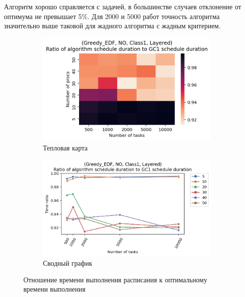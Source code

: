 Алгоритм хорошо справляется с задачей, в большинстве случаев отклонение от оптимума не превышает 5\%. Для 2000 и 5000 работ точность алгоритма значительно выше таковой для жадного алгоритма с жадным критерием.

\begin{figure}[!htbp]
    \centering
    \begin{subfigure}{0.49\textwidth}
        \includegraphics[width=\textwidth]{imgs/layered_class_1/NO_EDF/times.png}
        \caption{Тепловая карта}
        \label{fig:NO-layered-EDF-times-heatmap}
    \end{subfigure}
    \hfill
    \begin{subfigure}{0.49\textwidth}
        \includegraphics[width=\textwidth]{imgs/layered_class_1/NO_EDF/gr_amalgamated.png}
        \caption{Сводный график} 
        \label{fig:NO-layered-EDF-times-compiled}
    \end{subfigure}
    \caption{Отношение времени выполнения расписания к оптимальному времени выполнения}
\end{figure}

